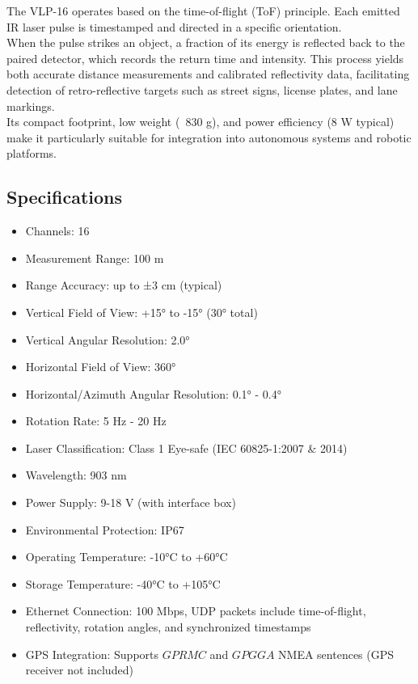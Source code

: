 \noindent The VLP-16 operates based on the time-of-flight (ToF) principle. Each emitted IR laser pulse is timestamped and directed in a specific orientation. \\
When the pulse strikes an object, a fraction of its energy is reflected back to the paired detector, which records the return time and intensity. 
This process yields both accurate distance measurements and calibrated reflectivity data, facilitating detection of retro-reflective targets such as street signs, 
license plates, and lane markings.
\\
Its compact footprint, low weight (~830 g), and power efficiency (8 W typical) make it particularly suitable for integration into autonomous systems and robotic platforms.

\subsection{Specifications}
\begin{itemize}
    \item Channels: 16
    \item Measurement Range: 100 m
    \item Range Accuracy: up to ±3 cm (typical)
    \item Vertical Field of View: +15° to -15° (30° total)
    \item Vertical Angular Resolution: 2.0°
    \item Horizontal Field of View: 360°
    \item Horizontal/Azimuth Angular Resolution: 0.1° - 0.4°
    \item Rotation Rate: 5 Hz - 20 Hz
    \item Laser Classification: Class 1 Eye-safe (IEC 60825-1:2007 \& 2014)
    \item Wavelength: 903 nm
    \item Power Supply: 9-18 V (with interface box)
    \item Environmental Protection: IP67
    \item Operating Temperature: -10°C to +60°C
    \item Storage Temperature: -40°C to +105°C
    \item Ethernet Connection: 100 Mbps, UDP packets include time-of-flight, reflectivity, rotation angles, and synchronized timestamps
    \item GPS Integration: Supports $GPRMC$ and $GPGGA$ NMEA sentences (GPS receiver not included)
\end{itemize}

